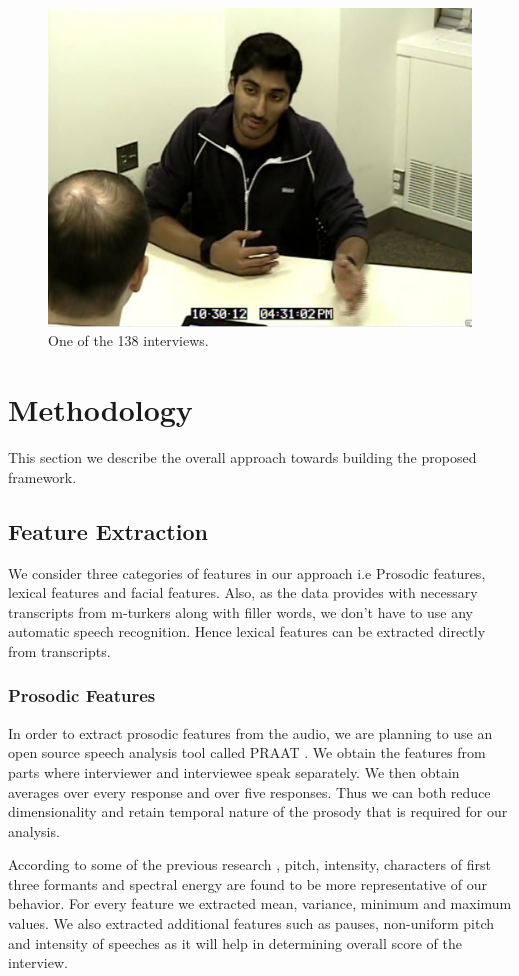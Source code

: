 \documentclass[11pt]{article}
\begin{document}
\begin{figure}[h!]
\begin{center}
\includegraphics[width=0.7\columnwidth]{figures/Screenshot from 2016-10-21 20-30-05/Screenshot from 2016-10-21 20-30-05}
\caption{One of the 138 interviews.}
\label{fig:dataset}
\end{center}
\end{figure}

\section{Methodology}
This section we describe the overall approach towards building the proposed framework.
\subsection{Feature Extraction}
We consider three categories of features in our approach i.e Prosodic features, lexical features and facial features. Also, as the data provides with necessary transcripts from m-turkers along with filler words, we don't have to use any automatic speech recognition. Hence lexical features can be extracted directly from transcripts.
\subsubsection{Prosodic Features}
In order to extract prosodic features from the audio, we are planning to use an open source speech analysis tool called PRAAT \cite{naim2015automated}. We obtain the features from parts where interviewer and interviewee speak separately. We then obtain averages over every response and over five responses. Thus we can both reduce dimensionality and retain temporal nature of the prosody that is required for our analysis.

According to some of the previous research \cite{frick1985communicating}, pitch, intensity, characters of first three formants and spectral energy are found to be more representative of our behavior. For every feature we extracted mean, variance, minimum and maximum values. We also extracted additional features such as pauses, non-uniform pitch and intensity of speeches as it will help in determining overall score of the interview.
\end{document}

